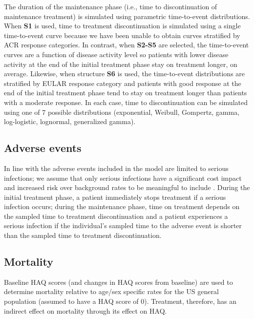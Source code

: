 \documentclass[11pt,final,fleqn]{article}
\theoremstyle{plain}
\begin{document}
The duration of the maintenance phase (i.e., time to discontinuation of maintenance treatment) is simulated using parametric time-to-event distributions. When \textbf{S1} is used, time to treatment discontinuation is simulated using a single time-to-event curve because we have been unable to obtain curves stratified by ACR response categories. In contrast, when \textbf{S2-S5} are selected, the time-to-event curves are a function of disease activity level so patients with lower disease activity at the end of the initial treatment phase stay on treatment longer, on average. Likewise, when structure \textbf{S6} is used, the time-to-event distributions are stratified by EULAR response category and patients with good response at the end of the initial treatment phase tend to stay on treatment longer than patients with a moderate response. In each case, time to discontinuation can be simulated using one of 7 possible distributions (exponential, Weibull, Gompertz, gamma, log-logistic, lognormal, generalized gamma).

\subsection{Adverse events}
In line with \citet{stevenson2016adalimumab} the adverse events included in the model are limited to serious infections; we assume that only serious infections have a significant cost impact and increased risk over background rates to be meaningful to include \citep{ramiro2017safety}. During the initial treatment phase, a patient immediately stops treatment if a serious infection occurs; during the maintenance phase, time on treatment depends on the sampled time to treatment discontinuation and a patient experiences a serious infection if the individual's sampled time to the adverse event is shorter than the sampled time to treatment discontinuation. 

\subsection{Mortality}
Baseline HAQ scores (and changes in HAQ scores from baseline) are used to determine mortality relative to age/sex specific rates for the US general population (assumed to have a HAQ score of 0). Treatment, therefore, has an indirect effect on mortality through its effect on HAQ. 
\end{document}

